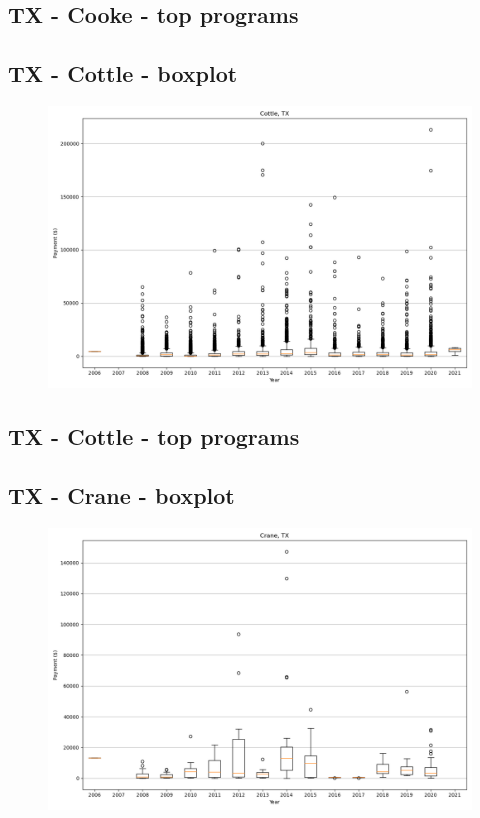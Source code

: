 \subsection*{TX - Cooke - top programs}

\newpage
\subsection*{TX - Cottle - boxplot}
\begin{figure}[h]
\centering
\includegraphics[width=7in]{../output/boxplots/counties/Cottle-TX_boxplot.png}
\end{figure}


\subsection*{TX - Cottle - top programs}

\newpage
\subsection*{TX - Crane - boxplot}
\begin{figure}[h]
\centering
\includegraphics[width=7in]{../output/boxplots/counties/Crane-TX_boxplot.png}
\end{figure}


